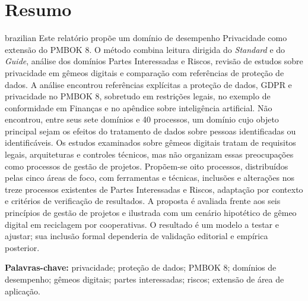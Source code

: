 \documentclass[11pt,a4paper]{article}
\newcommand{\SingleSpacing}{}
\newcommand{\onelineskip}{\baselineskip}
\newenvironment{resumo}[1][Abstract]{\section*{#1}\noindent\ignorespaces}{\bigskip}
\begin{document}
\begin{resumo}[Resumo]
\begin{otherlanguage*}{brazilian}
Este relatório propõe um domínio de desempenho Privacidade como extensão do PMBOK 8. O método combina leitura dirigida do \textit{Standard} e do \textit{Guide}, análise dos domínios Partes Interessadas e Riscos, revisão de estudos sobre privacidade em gêmeos digitais e comparação com referências de proteção de dados. A análise encontrou referências explícitas a proteção de dados, GDPR e privacidade no PMBOK 8, sobretudo em restrições legais, no exemplo de conformidade em Finanças e no apêndice sobre inteligência artificial. Não encontrou, entre seus sete domínios e 40 processos, um domínio cujo objeto principal sejam os efeitos do tratamento de dados sobre pessoas identificadas ou identificáveis. Os estudos examinados sobre gêmeos digitais tratam de requisitos legais, arquiteturas e controles técnicos, mas não organizam essas preocupações como processos de gestão de projetos. Propõem-se oito processos, distribuídos pelas cinco áreas de foco, com ferramentas e técnicas, inclusões e alterações nos treze processos existentes de Partes Interessadas e Riscos, adaptação por contexto e critérios de verificação de resultados. A proposta é avaliada frente aos seis princípios de gestão de projetos e ilustrada com um cenário hipotético de gêmeo digital em reciclagem por cooperativas. O resultado é um modelo a testar e ajustar; sua inclusão formal dependeria de validação editorial e empírica posterior.

\vspace{\onelineskip}
\noindent\textbf{Palavras-chave:} privacidade; proteção de dados; PMBOK 8; domínios de desempenho; gêmeos digitais; partes interessadas; riscos; extensão de área de aplicação.
\end{otherlanguage*}
\end{resumo}
\clearpage

\begingroup
\SingleSpacing
\end{document}
